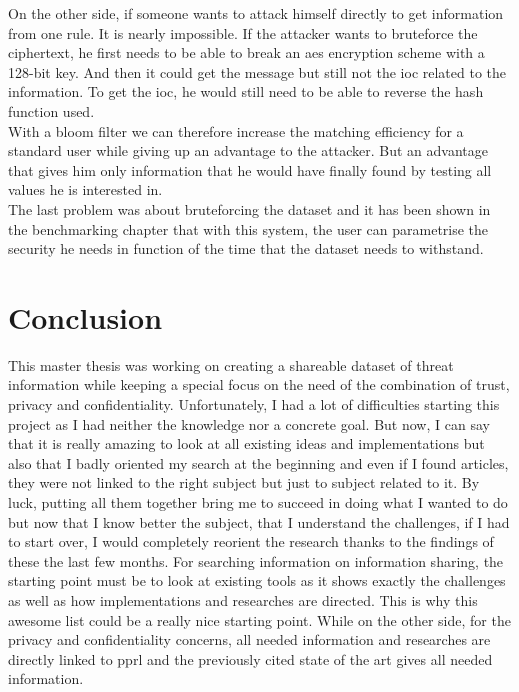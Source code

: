 \documentclass{eplmastersthesis}
\begin{document}
On the other side, if someone wants to attack himself directly to get information from one rule. It is nearly impossible. If the attacker wants to bruteforce the ciphertext, he first needs to be able to break an \gls{aes} encryption scheme with a 128-bit key. And then it could get the message but still not the \gls{ioc} related to the information.
To get the \gls{ioc}, he would still need to be able to reverse the hash function used.\\

With a bloom filter we can therefore increase the matching efficiency for a standard user while giving up an advantage to the attacker. But an advantage that gives him only information that he would have finally found by testing all values he is interested in.\\

The last problem was about bruteforcing the dataset and it has been shown in the benchmarking chapter that with this system, the user can parametrise the security he needs in function of the time that the dataset needs to withstand. 

\section{Conclusion}
This master thesis was working on creating a shareable dataset of threat information while keeping a special focus on the need of the combination of trust, privacy and confidentiality.
Unfortunately, I had a lot of difficulties starting this project as I had neither the knowledge nor a concrete goal. But now, I can say that it is really amazing to look at all existing ideas and implementations but also that I badly oriented my search at the beginning and even if I found articles, they were not linked to the right subject but just to subject related to it. By luck, putting all them together bring me to succeed in doing what I wanted to do but now that I know better the subject, that I understand the challenges, if I had to start over, I would completely reorient the research thanks to the findings of these the last few months.
For searching information on information sharing, the starting point must be to look at existing tools as it shows exactly the challenges as well as how implementations and researches are directed. This is why this awesome list \cite{AwesomeTreat} could be a really nice starting point.
While on the other side, for the privacy and confidentiality concerns, all needed information and researches are directly linked to \gls{pprl} and the previously cited state of the art \cite{vatsalanprivacy} gives all needed information.\\
\end{document}
